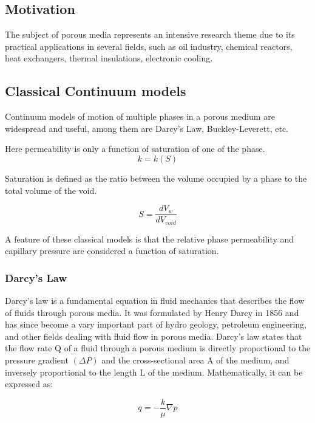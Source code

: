 \subsection{Motivation}

The subject of porous media represents an intensive research theme due to its practical applications in several fields, such as oil industry, chemical reactors, heat exchangers, thermal insulations, electronic cooling. \cite{labed2012experimental}


\subsection{Classical Continuum models}

	Continuum models of motion of multiple phases in a porous medium are widespread and useful, among them are Darcy's Law, Buckley-Leverett, etc.
	
	Here permeability is only a function of saturation of one of the phase.
	\begin{equation}
		k = k(S)
	\end{equation}

	Saturation is defined as the ratio between the volume occupied by a phase to the total volume of the void.

	\[ S = \frac{dV_{w}}{dV_{void}} \]
	
	A feature of these classical models is that the relative phase permeability and capillary pressure are considered a function of saturation. 


	\subsubsection{Darcy's Law}
		Darcy's law is a fundamental equation in fluid mechanics that describes the flow of fluids through porous media. It was formulated by Henry Darcy in 1856 and has since become a vary important part of hydro geology, petroleum engineering, and other fields dealing with fluid flow in porous media.
		Darcy's law states that the flow rate Q of a fluid through a porous medium is directly proportional to the pressure gradient $(\Delta P)$ and the cross-sectional area A of the medium, and inversely proportional to the length L of the medium. Mathematically, it can be expressed as:

		\begin{equation}
			q = -\frac{k}{\mu} \nabla p
			\label{eq:basic-darcy}
		\end{equation}

